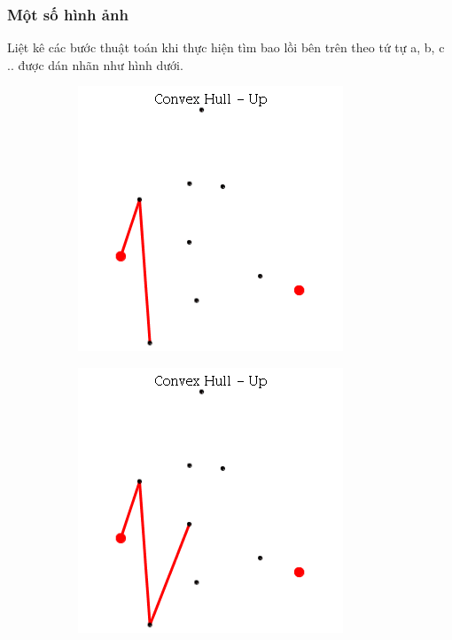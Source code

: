 \documentclass[12pt]{article}
\begin{document}
        \subsubsection*{Một số hình ảnh} 
          Liệt kê các bước thuật toán khi thực hiện tìm bao lồi bên trên theo tứ tự a, b, c .. được dán nhãn như hình dưới.
          \begin{figure}[h]
            \centering
            \begin{subfigure}[h]{0.275\linewidth}
              \includegraphics[width=\linewidth]{GIF/Up-2}
              \caption{}
            \end{subfigure}
            \begin{subfigure}[h]{0.275\linewidth}
              \includegraphics[width=\linewidth]{GIF/Up-3}

\end{subfigure}
\end{figure}
\end{document}
